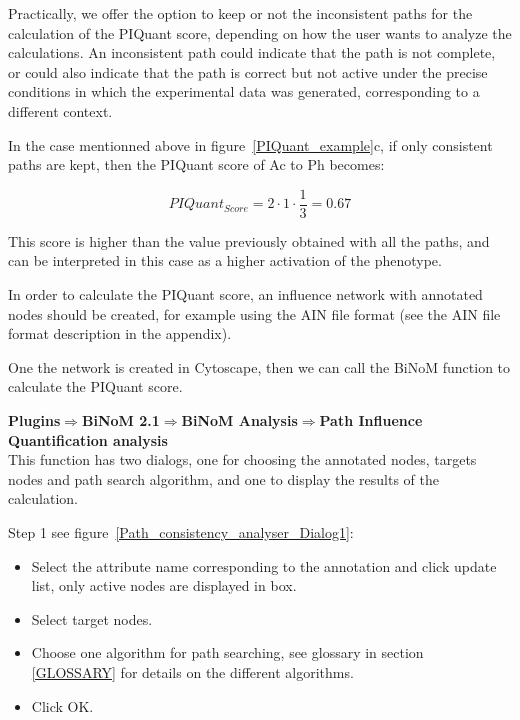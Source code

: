 Practically, we offer the option to
keep or not the inconsistent paths for the calculation of the PIQuant score,
depending on how the user wants to analyze the calculations. An inconsistent
path could indicate that the path is not complete, or could also indicate that
the path is correct but not active under the precise conditions in which the
experimental data was generated, corresponding to a different context.

In the case mentionned above in figure~\ref{PIQuant_example}c, if only consistent paths are kept, then the PIQuant score of Ac to Ph
becomes:

$$
 PIQuant_{Score} = 2 \cdot 1 \cdot \frac{1}{3} = 0.67
$$

This score is higher than the value previously obtained with all the paths, and can be interpreted in this case as a higher activation of the phenotype.


In order to calculate the PIQuant score, an influence network with annotated
nodes should be created, for example using the AIN file format (see the AIN file
format description in the appendix).

One the network is created in Cytoscape, then we can call the BiNoM function to calculate the PIQuant score.

\textbf{Plugins$\Rightarrow$BiNoM 2.1$\Rightarrow$BiNoM Analysis$\Rightarrow$Path Influence Quantification analysis}\\


This function has two dialogs, one for choosing the annotated nodes, targets nodes and path search algorithm, and one to display the results of the calculation.

Step 1 see figure~\ref{Path_consistency_analyser_Dialog1}:

\begin{itemize}
  \item Select the attribute name corresponding to the annotation and click update list, only active nodes are
  displayed in box.
  \item Select target nodes.
  \item Choose one algorithm for path searching, see glossary in section \ref{GLOSSARY} for details on the different algorithms.
  \item Click OK.
\end{itemize}

